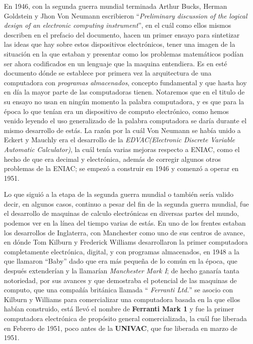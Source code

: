 \documentclass[letterpaper,12pt,oneside]{book}
\begin{document}
		En 1946, con la segunda guerra mundial terminada Arthur Bucks, Herman Goldstein y Jhon Von Neumann escribieron ``\textit{Preliminary discussion of the
		logical design  of an electronic computing instrument}'', en el cuál como ellos mismos describen en el prefacio del documento, hacen
		un primer ensayo para sintetizar las ideas que hay sobre estos dispositivos electrónicos, tener una imagen de la situación en la que estaban y
		presentar como los problemas matemáticos podían ser ahora codificados en un lenguaje que la maquina entendiera. Es en esté documento dónde
		se establece por primera vez la arquitectura de una computadora con  \textit{programas almacenados}, concepto fundamental y que hasta hoy
		en día la mayor parte de las computadoras tienen. Notaremos que en el titulo de su ensayo no usan en ningún momento la palabra computadora, y
		es que para la época lo que tenían era un dispositivo de computo electrónico, como hemos venido leyendo el uso generalizado de la palabra computadora
		se daría durante el mismo desarrollo de estás. La razón por la cuál Von Neumann se había unido a Eckert y Mauchly era el desarrollo de la
		\textit{EDVAC(Electronic Discrete Variable Automatic Calculator)}, la cuál tenía varias mejoras respecto a ENIAC, como el hecho de que era decimal
		y electrónica, además de corregir algunos otros problemas de la ENIAC; se empezó a construir en 1946 y comenzó a operar en 1951.
		
		Lo que siguió a la etapa de la segunda guerra mundial o también sería valido decir, en algunos casos, continuo a pesar  del fin de la
		segunda guerra mundial, fue el desarrollo de maquinas de calculo electrónicas en diversas partes del mundo, podemos ver en la línea del
		tiempo varias de estás. En uno de los frentes estaban los desarrollos de Inglaterra, con Manchester como uno de sus centros
		de avance, en dónde Tom Kilburn y Frederick Williams desarrollaron la primer computadora completamente electrónica, digital, y con programas almacenados, en 1948 a
		la que llamaron ``Baby'' dado que era más pequeña de lo común en la época, que después extenderían y la llamarían \textit{Manchester Mark I}; de hecho
		ganaría tanta notoriedad, por sus avances y que demostraba el potencial de las  maquinas de computo, que una compañía británica
		llamada `` \textit{Ferranti Ltd.}'' se asocio con Kilburn y Williams para comercializar una computadora basada en la que ellos habían construido,
		está llevó el nombre  de \textbf{Ferranti Mark 1} y fue la primer computadora electrónica de propósito general comercializada, la cuál fue liberada
		en Febrero de 1951, poco antes de la \textbf{UNIVAC}, que fue liberada en marzo de 1951.
\end{document}
